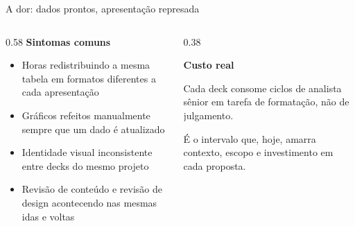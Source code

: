 \begin{frame}{A dor: dados prontos, apresentação represada}
  \vspace{4mm}
  \begin{columns}[T, onlytextwidth]
    \begin{column}{0.58\textwidth}
      {\bfseries Sintomas comuns}\par\vspace{1.5mm}
      \begin{itemize}
        \item Horas redistribuindo a mesma tabela em formatos diferentes a cada apresentação
        \item Gráficos refeitos manualmente sempre que um dado é atualizado
        \item Identidade visual inconsistente entre decks do mesmo projeto
        \item Revisão de conteúdo e revisão de design acontecendo nas mesmas idas e voltas
      \end{itemize}
    \end{column}
    \begin{column}{0.38\textwidth}
      \vspace{4mm}
      \begin{amcard}
        {\bfseries Custo real}\par\vspace{1.5mm}
        Cada deck consome ciclos de analista sênior em tarefa de formatação, não de julgamento.\par\vspace{2mm}
        É o intervalo que, hoje, amarra contexto, escopo e investimento em cada proposta.
      \end{amcard}
    \end{column}
  \end{columns}
\end{frame}